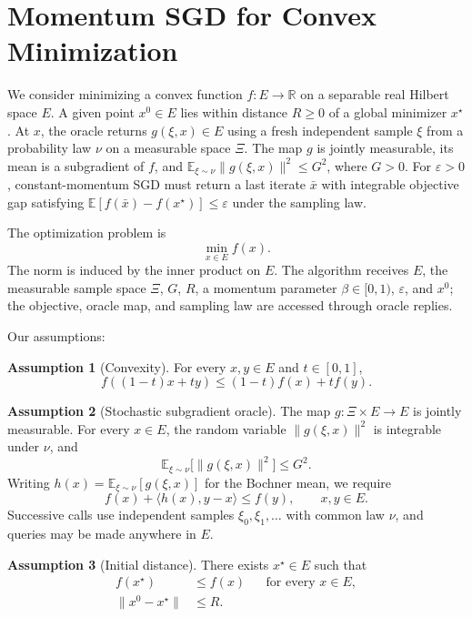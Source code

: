 \documentclass[10pt]{article}
\theoremstyle{definition}
\newtheorem{assumption}{Assumption}
\begin{document}
\section*{Momentum SGD for Convex Minimization}
We consider minimizing a convex function $f:E\to\mathbb{R}$ on a separable real Hilbert space $E$. A given point $x^0\in E$ lies within distance $R\geq0$ of a global minimizer $x^\star$. At $x$, the oracle returns $g(\xi,x)\in E$ using a fresh independent sample $\xi$ from a probability law $\nu$ on a measurable space $\Xi$. The map $g$ is jointly measurable, its mean is a subgradient of $f$, and $\mathbb{E}_{\xi\sim\nu}\|g(\xi,x)\|^2\leq G^2$, where $G>0$. For $\varepsilon>0$, constant-momentum SGD must return a last iterate $\bar{x}$ with integrable objective gap satisfying $\mathbb{E}[f(\bar{x})-f(x^\star)]\leq\varepsilon$ under the sampling law.

The optimization problem is
\[
\min_{x\in E} f(x).
\]
The norm is induced by the inner product on $E$. The algorithm receives $E$, the measurable sample space $\Xi$, $G$, $R$, a momentum parameter $\beta\in[0,1)$, $\varepsilon$, and $x^0$; the objective, oracle map, and sampling law are accessed through oracle replies.

Our assumptions:
\begin{assumption}[Convexity]
For every $x,y\in E$ and $t\in[0,1]$,
\[
f((1-t)x+ty)\leq(1-t)f(x)+tf(y).
\]
\end{assumption}

\begin{assumption}[Stochastic subgradient oracle]
The map $g:\Xi\times E\to E$ is jointly measurable. For every $x\in E$, the random variable $\|g(\xi,x)\|^2$ is integrable under $\nu$, and
\[
\mathbb{E}_{\xi\sim\nu}\bigl[\|g(\xi,x)\|^2\bigr]\leq G^2.
\]
Writing $h(x)=\mathbb{E}_{\xi\sim\nu}[g(\xi,x)]$ for the Bochner mean, we require
\[
f(x)+\langle h(x),y-x\rangle\leq f(y),
\qquad x,y\in E.
\]
Successive calls use independent samples $\xi_0,\xi_1,\ldots$ with common law $\nu$, and queries may be made anywhere in $E$.
\end{assumption}

\begin{assumption}[Initial distance]
There exists $x^\star\in E$ such that
\[
\begin{aligned}
f(x^\star)&\leq f(x) &&\text{for every }x\in E,\\
\|x^0-x^\star\|&\leq R.
\end{aligned}
\]
\end{assumption}
\end{document}
